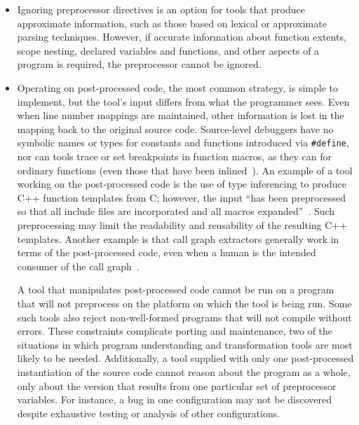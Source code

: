 \documentclass[10pt]{article}
\begin{document}
\begin{itemize}

\item Ignoring preprocessor directives is an option for tools that produce
  approximate information, such as those based on lexical or approximate
  parsing techniques.  However, if accurate information about function
  extents, scope nesting, declared variables and functions, and other
  aspects of a program is required, the preprocessor cannot be ignored.

\item Operating on post-processed code, the most common strategy, is
  simple to implement, but the tool's input differs from what the
  programmer sees.  Even when line number mappings are maintained,
  other information is lost in the mapping back to the original source
  code.  Source-level debuggers have no symbolic names or types for
  constants and functions introduced via {\tt \#define}, nor can tools
  trace or set breakpoints in function macros, as they can for
  ordinary functions (even those that have been
  inlined~\cite{Zellweger83:TR}).  An example of a tool working on the
  post-processed code is the use of type inferencing to produce C++
  function templates from C; however, the input ``has been
  preprocessed so that all include files are incorporated and all
  macros expanded''~\cite[p.~145]{Siff-fse96}.  Such preprocessing may
  limit the readability and reusability of the resulting C++
  templates.  Another example is that call graph extractors generally
  work in terms of the post-processed code, even when a human is the
  intended consumer of the call graph~\cite{Murphy-icse18}.


  A tool that manipulates post-processed code cannot be run on a
  program that will not preprocess on the platform on which the tool
  is being run.  Some such tools also reject non-well-formed programs
  that will not compile without errors.  These constraints complicate
  porting and maintenance, two of the situations in which program
  understanding and transformation tools are most likely to be needed.
  Additionally, a tool supplied with only one post-processed
  instantiation of the source code cannot reason about the program as
  a whole, only about the version that results from one particular set
  of preprocessor variables.  For instance, a bug in one configuration
  may not be discovered despite exhaustive testing or analysis of
  other configurations.



  


\end{itemize}
\end{document}
